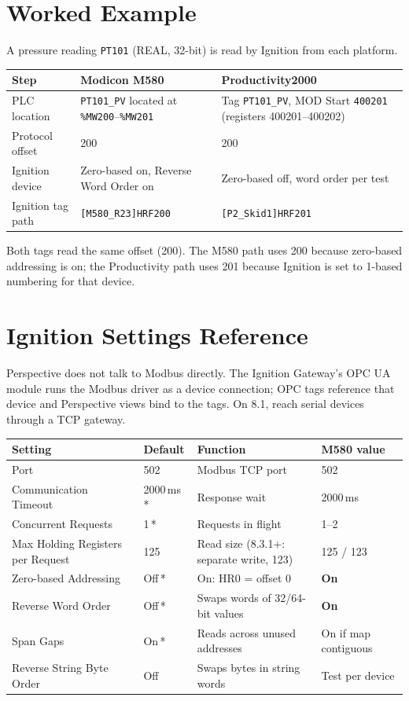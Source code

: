 \section{Worked Example}
A pressure reading \texttt{PT101} (REAL, 32-bit) is read by Ignition from each platform.
\begin{longtable}{@{}P{3.25cm}P{6.82cm}P{6.82cm}@{}}
\toprule
\textbf{Step} & \textbf{Modicon M580} & \textbf{Productivity2000} \\
\midrule
\endhead
PLC location & \texttt{PT101\_PV} located at \texttt{\%MW200}--\texttt{\%MW201} & Tag \texttt{PT101\_PV}, MOD Start \texttt{400201} (registers 400201--400202) \\
Protocol offset & 200 & 200 \\
Ignition device & Zero-based on, Reverse Word Order on & Zero-based off, word order per test \\
Ignition tag path & \texttt{[M580\_R23]HRF200} & \texttt{[P2\_Skid1]HRF201} \\
\bottomrule
\end{longtable}
Both tags read the same offset (200). The M580 path uses 200 because zero-based addressing is on; the Productivity path uses 201 because Ignition is set to 1-based numbering for that device.

\section{Ignition Settings Reference}
Perspective does not talk to Modbus directly. The Ignition Gateway's OPC UA module runs the Modbus driver as a device connection; OPC tags reference that device and Perspective views bind to the tags. On 8.1, reach serial devices through a TCP gateway.

\begin{longtable}{@{}P{5.27cm}P{2.75cm}P{5.04cm}P{3.43cm}@{}}
\toprule
\textbf{Setting} & \textbf{Default} & \textbf{Function} & \textbf{M580 value} \\
\midrule
\endhead
Port & 502 & Modbus TCP port & 502 \\
Communication Timeout & 2000\,ms\,* & Response wait & 2000\,ms \\
Concurrent Requests & 1\,* & Requests in flight & 1--2 \\
Max Holding Registers per Request & 125 & Read size (8.3.1+: separate write, 123) & 125 / 123 \\
Zero-based Addressing & Off\,* & On: HR0 = offset 0 & \textbf{On} \\
Reverse Word Order & Off\,* & Swaps words of 32/64-bit values & \textbf{On} \\
Span Gaps & On\,* & Reads across unused addresses & On if map contiguous \\
Reverse String Byte Order & Off & Swaps bytes in string words & Test per device \\
\bottomrule
\end{longtable}

